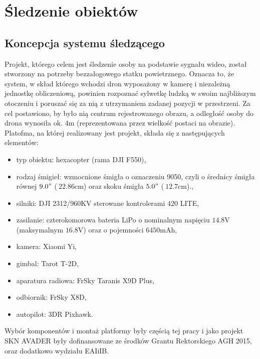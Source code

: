 
\chapter{Śledzenie obiektów}
\label{cha:sledzenieObiektow}

\section{Koncepcja systemu śledzącego}
Projekt, którego celem jest śledzenie osoby na podstawie sygnału wideo, został stworzony na potrzeby bezzałogowego statku powietrznego. Oznacza to, że system, w skład którego wchodzi dron wyposażony w kamerę i niezależną jednostkę obliczeniową, powinien rozpoznać sylwetkę ludzką w swoim najbliższym otoczeniu i poruszać się za nią z utrzymaniem zadanej pozycji w przestrzeni. Za cel postawiono, by było nią centrum rejestrowanego obrazu, a odległość osoby do drona wynosiła ok. 4m (reprezentowana przez wielkość postaci na obrazie).
Platofma, na której realizowany jest projekt, składa się z następujących elementów:
\begin{itemize}
	\item typ obiektu: hexacopter (rama DJI F550),
	\item rodzaj śmigieł: wzmocnione śmigła o oznaczeniu 9050, czyli o średnicy śmigła równej $9.0"$ ($~22.86$cm) oraz skoku śmigła $5.0"$ ($~12.7$cm).,
	\item silniki: DJI 2312/960KV sterowane kontrolerami 420 LITE,
	\item zasilanie: czterokomorowa bateria LiPo o nominalnym napięciu $14.8$V (maksymalnym $16.8$V) oraz o pojemności $6450$mAh,
	\item kamera: Xiaomi Yi,
	\item gimbal: Tarot T-2D,
	\item aparatura radiowa: FrSky Taranis X9D Plus,
	\item odbiornik: FrSky X8D,
	\item autopilot: 3DR Pixhawk.
\end{itemize}
Wybór komponentów i montaż platformy były częścią tej pracy i jako projekt SKN AVADER były dofinansowane ze środków Grantu Rektorskiego AGH 2015, oraz dodatkowo wydziału EAIiIB.


